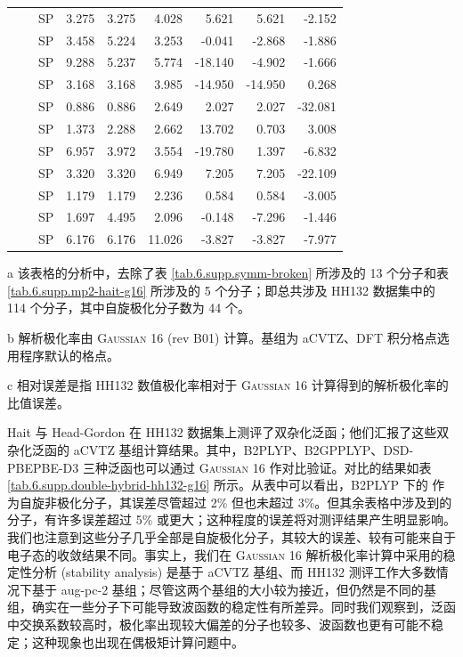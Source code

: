 \begin{table}[!htp]
{\begin{tabular}{llld{1.3}d{1.3}d{1.3}d{3.3}d{3.3}d{3.3}}
    &  & SP  & 3.275 & 3.275 & 4.028  & 5.621   & 5.621   & -2.152  \\
    &  & SP  & 3.458 & 5.224 & 3.253  & -0.041  & -2.868  & -1.886  \\
    &  & SP  & 9.288 & 5.237 & 5.774  & -18.140 & -4.902  & -1.666  \\
    &  & SP  & 3.168 & 3.168 & 3.985  & -14.950 & -14.950 & 0.268   \\
    &  & SP  & 0.886 & 0.886 & 2.649  & 2.027   & 2.027   & -32.081 \\
    &  & SP  & 1.373 & 2.288 & 2.662  & 13.702  & 0.703   & 3.008   \\
    &  & SP  & 6.957 & 3.972 & 3.554  & -19.780 & 1.397   & -6.832  \\
    &  & SP  & 3.320 & 3.320 & 6.949  & 7.205   & 7.205   & -22.109 \\
    &  & SP  & 1.179 & 1.179 & 2.236  & 0.584   & 0.584   & -3.005  \\
    &  & SP  & 1.697 & 4.495 & 2.096  & -0.148  & -7.296  & -1.446  \\
    &  & SP  & 6.176 & 6.176 & 11.026 & -3.827  & -3.827  & -7.977  \\
    \bottomrule
    \end{tabular}
}{
    \item[a] 该表格的分析中，去除了表 \ref{tab.6.supp.symm-broken} 所涉及的 13 个分子和表 \ref{tab.6.supp.mp2-hait-g16} 所涉及的 5 个分子；即总共涉及 HH132 数据集中的 114 个分子，其中自旋极化分子数为 44 个。
    \item[b] 解析极化率由 \textsc{Gaussian 16} (rev B01)\cite{Gaussian16} 计算。基组为 aCVTZ、DFT 积分格点选用程序默认的格点。
    \item[c] 相对误差是指 HH132 数值极化率相对于 \textsc{Gaussian 16} 计算得到的解析极化率的比值误差。
}
\end{table}

Hait 与 Head-Gordon 在 HH132 数据集上测评了双杂化泛函\cite{Hait-Head-Gordon.PCCP.2018}；他们汇报了这些双杂化泛函的 aCVTZ 基组计算结果。其中，B2PLYP、B2GPPLYP、DSD-PBEPBE-D3 三种泛函也可以通过 \textsc{Gaussian 16} 作对比验证。对比的结果如表 \ref{tab.6.supp.double-hybrid-hh132-g16} 所示。从表中可以看出，B2PLYP 下的  作为自旋非极化分子，其误差尽管超过 2\% 但也未超过 3\%。但其余表格中涉及到的分子，有许多误差超过 5\% 或更大；这种程度的误差将对测评结果产生明显影响。我们也注意到这些分子几乎全部是自旋极化分子，其较大的误差、较有可能来自于电子态的收敛结果不同。事实上，我们在 \textsc{Gaussian 16} 解析极化率计算中采用的稳定性分析 (stability analysis) 是基于 aCVTZ 基组、而 HH132 测评工作大多数情况下基于 aug-pc-2 基组\cite{Hait-Head-Gordon.PCCP.2018}；尽管这两个基组的大小较为接近，但仍然是不同的基组，确实在一些分子下可能导致波函数的稳定性有所差异。同时我们观察到，泛函中交换系数较高时，极化率出现较大偏差的分子也较多、波函数也更有可能不稳定；这种现象也出现在偶极矩计算问题中\cite{Gu-Xu.JCTC.2021a}。

